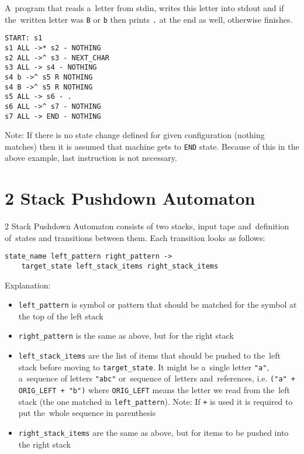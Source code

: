 \documentclass[english,shortabstract,mgr]{iithesis}
\begin{document}
A~program that reads a~letter from stdin, writes this letter into
stdout and if the~written letter was \texttt{B} or \texttt{b} then prints
\texttt{.} at the end as well, otherwise finishes.

\begin{verbatim}
START: s1
s1 ALL ->* s2 - NOTHING
s2 ALL ->^ s3 - NEXT_CHAR
s3 ALL -> s4 - NOTHING
s4 b ->^ s5 R NOTHING
s4 B ->^ s5 R NOTHING
s5 ALL -> s6 - .
s6 ALL ->^ s7 - NOTHING
s7 ALL -> END - NOTHING
\end{verbatim}

Note: If there is no state change defined for given configuration
(nothing matches) then it is assumed that machine gets to \texttt{END} state.
Because of this in the above example, last instruction is not necessary.

\section {2 Stack Pushdown Automaton}

2 Stack Pushdown Automaton consists of two stacks, input tape and~definition
of~states and transitions between them. Each transition looks as follows:
\begin{verbatim}
state_name left_pattern right_pattern ->
    target_state left_stack_items right_stack_items
\end{verbatim}

Explanation:
\begin{itemize}
  \item \texttt{left\_pattern} is symbol or pattern that should be matched
      for the symbol at the top of the left stack
  \item \texttt{right\_pattern} is the same as above, but for the right stack
  \item \texttt{left\_stack\_items} are the list of items that should be pushed
      to the~left stack before moving to \texttt{target\_state}. It might be
      a~single letter \texttt{"a"}, a~sequence of letters \texttt{"abc"}
      or~sequence of~letters and~references, i.e. \texttt{("a" + ORIG\_LEFT + "b")}
      where \texttt{ORIG\_LEFT} means the letter we read from the~left stack (the one matched
      in \texttt{left\_pattern}). Note: If \texttt{+} is used it is required to put
      the~whole sequence in parenthesis
  \item \texttt{right\_stack\_items} are the same as above, but for items to be pushed into
      the right stack
\end{itemize}
\end{document}
